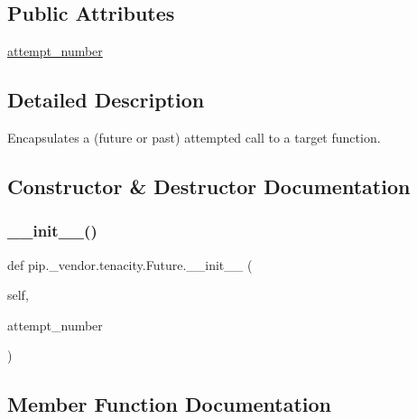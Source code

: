 \subsection*{Public Attributes}
\begin{DoxyCompactItemize}
\item 
\hyperlink{classpip_1_1__vendor_1_1tenacity_1_1Future_ab487c605320148dd8eb75eed78c456a7}{attempt\+\_\+number}
\end{DoxyCompactItemize}


\subsection{Detailed Description}
\begin{DoxyVerb}Encapsulates a (future or past) attempted call to a target function.\end{DoxyVerb}
 

\subsection{Constructor \& Destructor Documentation}
\mbox{\label{classpip_1_1__vendor_1_1tenacity_1_1Future_a04084a63bbc75df29227ac834bf93bea}} 
\subsubsection{\texorpdfstring{\+\_\+\+\_\+init\+\_\+\+\_\+()}{\_\_init\_\_()}}
{\footnotesize\ttfamily def pip.\+\_\+vendor.\+tenacity.\+Future.\+\_\+\+\_\+init\+\_\+\+\_\+ (\begin{DoxyParamCaption}\item[{}]{self,  }\item[{}]{attempt\+\_\+number }\end{DoxyParamCaption})}



\subsection{Member Function Documentation}
\mbox{\label{classpip_1_1__vendor_1_1tenacity_1_1Future_aa9bf7b4df4838f47bafcaef40fa29b1c}} 
